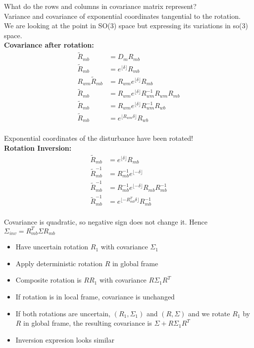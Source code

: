 What do the rows and columns in covariance matrix represent?\\
Variance and covariance of exponential coordinates tangential to the rotation.\\
We are looking at the point in SO(3) space but expressing its variations in so(3) space.\\

\textbf{Covariance after rotation:}
\begin{align*}
  \tilde{R}_{mb} &= D_m R_{mb} \\
  \tilde{R}_{mb} &= e^{\lfloor \delta \rfloor} R_{mb} \\
  R_{wm} \tilde{R}_{mb} &= R_{wm}e^{\lfloor \delta \rfloor} R_{mb} \\
  \tilde{R}_{mb} &= R_{wm}e^{\lfloor \delta \rfloor} R_{wm}^{-1} R_{wm} R_{mb} \\
  \tilde{R}_{mb} &= R_{wm}e^{\lfloor \delta \rfloor} R_{wm}^{-1} R_{wb} \\
  \tilde{R}_{mb} &= e^{\lfloor R_{wm}\delta \rfloor} R_{wb} \\
\end{align*}

Exponential coordinates of the disturbance have been rotated!\\

\textbf{Rotation Inversion:}
\begin{align*}
  \tilde{R}_{mb} &= e^{\lfloor \delta \rfloor} R_{mb} \\
  \tilde{R}_{mb}^{-1} &= R_{mb}^{-1} e^{\lfloor -\delta \rfloor}  \\
  \tilde{R}_{mb}^{-1} &= R_{mb}^{-1} e^{\lfloor -\delta \rfloor} R_{mb} R_{mb}^{-1} \\
  \tilde{R}_{mb}^{-1} &= e^{\lfloor -R_{mb}^T \delta \rfloor} R_{mb}^{-1} \\
\end{align*}

Covariance is quadratic, so negative sign does not change it.
Hence $\Sigma_{inv} = R_{mb}^T \Sigma R_{mb}$

\begin{itemize}
  \item Have uncertain rotation $R_1$ with covariance $\Sigma_1$
  \item Apply deterministic rotation $R$ in global frame
  \item Composite rotation is $RR_1$ with covariance $R\Sigma_1 R^T$
  \item If rotation is in local frame, covariance is unchanged
  \item If both rotations are uncertain, $(R_1, \Sigma_1)$ and $(R, \Sigma)$ and we rotate $R_1$ by $R$ in global frame, the resulting covariance is
    $\Sigma + R \Sigma_1 R^T$
  \item Inversion expresion looks similar
\end{itemize}


